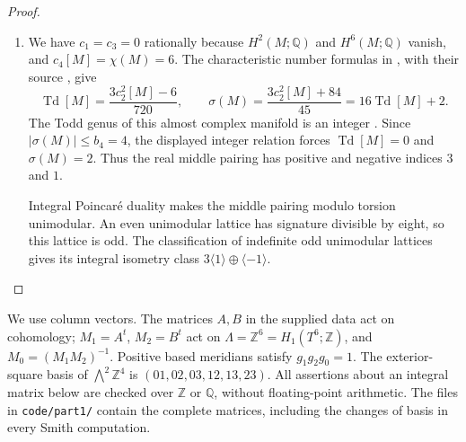 \begin{proof}
\begin{enumerate}[label=\arabic*.]
Over the two-dimensional pair of pants the prescribed boundary
sections of the associated $\mathcal J$-bundle extend over relative
one-cells by connectedness and over relative two-cells by simple
connectivity. Smooth approximation relative to the collars gives
a smooth vertical structure. Horizontal splittings form an affine
space, so a partition of unity extends the prescribed complex
splittings from those collars. Combining the vertical structure with
the pulled-back base structure and gluing the caps gives the required
almost complex structure on $M$.

\item We have $c_1=c_3=0$ rationally because $H^2(M;\mathbb Q)$ and
$H^6(M;\mathbb Q)$ vanish, and $c_4[M]=\chi(M)=6$. The characteristic
number formulas in , with their source
\cite[equations (1.2)--(1.4), pp.~3--4]{ffEsoleKang}, give
\[
 \operatorname{Td}[M]=\frac{3c_2^2[M]-6}{720},
 \qquad
 \sigma(M)=\frac{3c_2^2[M]+84}{45}
           =16\operatorname{Td}[M]+2.
\]
The Todd genus of this almost complex manifold is an integer
\cite[Theorem 24.5.4 and corollary, p.~184]{HirzebruchTopologicalMethods}.
Since $|\sigma(M)|\leq b_4=4$, the displayed integer relation forces
$\operatorname{Td}[M]=0$ and $\sigma(M)=2$. Thus the real middle
pairing has positive and negative indices $3$ and $1$.

Integral Poincar\'e duality makes the middle pairing modulo torsion
unimodular. An even unimodular lattice has signature divisible by
eight, so this lattice is odd. The classification of indefinite odd
unimodular lattices
\cite[Theorem 2.2.1, p.~61]{ffPetersSterk} gives its integral isometry
class $3\langle1\rangle\oplus\langle-1\rangle$.
\end{enumerate}
\end{proof}


\label{sec:fourfold}

We use column vectors.  The matrices $A,B$ in the supplied data act on
cohomology; $M_1=A^t$, $M_2=B^t$ act on
$\Lambda=\mathbb Z^6=H_1(T^6;\mathbb Z)$, and
$M_0=(M_1M_2)^{-1}$.  Positive based meridians satisfy
$g_1g_2g_0=1$.  The exterior-square basis of $\bigwedge^2\mathbb Z^4$
is $(01,02,03,12,13,23)$.  All assertions about an integral matrix below
are checked over $\mathbb Z$ or $\mathbb Q$, without floating-point
arithmetic.  The files in \texttt{code/part1/} contain the complete
matrices, including the changes of basis in every Smith computation.

